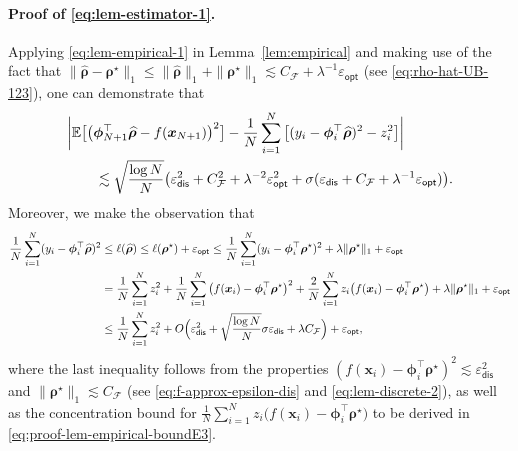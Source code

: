 \documentclass[english]{article}
\begin{document}
\paragraph{Proof of \eqref{eq:lem-estimator-1}.}
%
Applying \eqref{eq:lem-empirical-1} in Lemma~\ref{lem:empirical} and making use of the fact that $\|\widehat{\bm \rho} - {\bm \rho}^{\star}\|_1 \le \|\widehat{\bm \rho}\|_1 + \| {\bm \rho}^{\star}\|_1\lesssim C_{\mathcal{F}} + \lambda^{-1}\varepsilon_{\mathsf{opt}}$ (see \eqref{eq:rho-hat-UB-123}), one can demonstrate that
%
\begin{align}
& \bigg| \mathbb{E}\big[\big({\bm \phi}_{N+1}^{\top}\widehat{\bm \rho} - f({\bm x}_{N+1})\big)^2\big] - \frac{1}{N}\sum_{i = 1}^N \big[(y_i - {\bm \phi}_i^{\top}\widehat{\bm \rho})^2 - z_i^2\big]  \bigg| \notag\\
&\qquad \lesssim \sqrt{\frac{\log N}{N}}\big(\varepsilon_{\mathsf{dis}}^2 + C_{\mathcal{F}}^2 + \lambda^{-2}\varepsilon_{\mathsf{opt}}^2 + \sigma(\varepsilon_{\mathsf{dis}} + C_{\mathcal{F}} + \lambda^{-1}\varepsilon_{\mathsf{opt}})\big).
\label{eq:proof-lem-estimator-temp-1}
\end{align}
%
Moreover, we make the observation that
%
\begin{align}
\frac{1}{N}\sum_{i = 1}^N (y_i - {\bm \phi}_i^{\top}\widehat{\bm \rho})^2 &\le \ell(\widehat{\bm \rho})\le \ell({\bm \rho}^{\star}) + \varepsilon_{\mathsf{opt}}\le  \frac{1}{N}\sum_{i = 1}^N (y_i - {\bm \phi}_i^{\top}{\bm \rho}^{\star})^2 + \lambda \|{\bm \rho}^{\star}\|_1 + \varepsilon_{\mathsf{opt}} \notag\\
&= \frac{1}{N}\sum_{i = 1}^N z_i^2 + \frac1N\sum_{i=1}^N\big(f({\bm x}_i)-{\bm \phi}_i^{\top}{\bm \rho}^{\star}\big)^2 + \frac2N\sum_{i=1}^Nz_i\big(f({\bm x}_i)-{\bm \phi}_i^{\top}{\bm \rho}^{\star}\big) + \lambda\|{\bm \rho}^{\star}\|_1 + \varepsilon_{\mathsf{opt}}\notag\\
&\le \frac{1}{N}\sum_{i = 1}^N z_i^2  + O\Big(\varepsilon_{\mathsf{dis}}^2 + \sqrt{\frac{\log N}{N}}\sigma\varepsilon_{\mathsf{dis}} + \lambda C_{\mathcal{F}}\Big)
+ \varepsilon_{\mathsf{opt}},
\label{eq:proof-lem-estimator-temp-2}
\end{align}
%
where the last inequality follows from the properties $(f({\bm x}_i)-\bm{\phi}_i^{\top}{\bm \rho}^{\star})^2\lesssim \varepsilon_{\mathsf{dis}}^2$ and $\|{\bm \rho}^{\star}\|_1\lesssim C_{\mathcal{F}}$ (see \eqref{eq:f-approx-epsilon-dis} and \eqref{eq:lem-discrete-2}), as well as the concentration bound for $\frac1N\sum_{i=1}^Nz_i\big(f({\bm x}_i)-{\bm \phi}_i^{\top}{\bm \rho}^{\star}\big)$ to be derived in \eqref{eq:proof-lem-empirical-boundE3}. 
\end{document}
